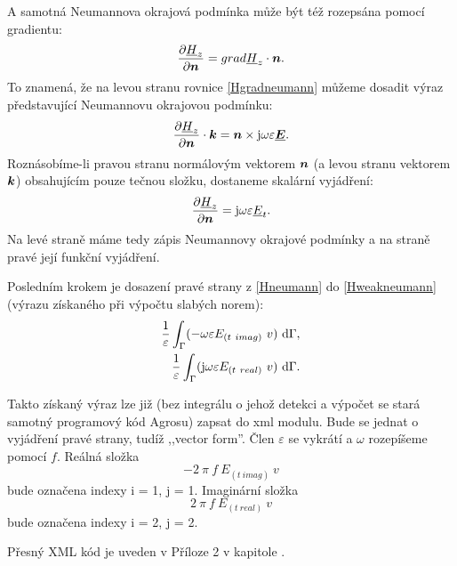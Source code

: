 \documentclass[12pt,a4paper,oneside]{article}
\numberwithin{equation}{section} %
\numberwithin{figure}{section} %
\numberwithin{table}{section} %
\newcommand{\mj}{\mathrm{j}} %
\renewcommand{\vec}[1]{\mbox{\boldmath$#1$}} %
\newcommand{\faz}[1]{{\underline{#1}}} %
\begin{document}
A samotná Neumannova okrajová podmínka může být též rozepsána pomocí gradientu:
\begin{equation}
\label{Hgradneumann}
\frac{\partial \faz{H}_z}{\partial \vec{n}} = grad \faz{H}_z \cdot \vec{n} .
\end{equation}
To znamená, že na levou stranu rovnice \ref{Hgradneumann} můžeme dosadit výraz představující Neumannovu okrajovou podmínku:
\begin{equation}
\label{NeumannHKvek}
\frac{\partial \faz{H}_z}{\partial \vec{n}} \cdot \vec{k} = \vec{n} \times \mj \omega \varepsilon \faz{\vec{E}}.
\end{equation}
Roznásobíme-li pravou stranu normálovým vektorem $\vec{n}$ (a levou stranu vektorem $\vec{k}$) obsahujícím pouze tečnou složku, dostaneme skalární vyjádření:
\begin{equation}
\label{Hneumann}
\frac{\partial \faz{H}_z}{\partial \vec{n}} = \mj \omega \varepsilon \faz{E}_t .
\end{equation}
Na levé straně máme tedy zápis Neumannovy okrajové podmínky a na straně pravé její funkční vyjádření.

Posledním krokem je dosazení pravé strany z \ref{Hneumann} do \ref{Hweakneumann} (výrazu získaného při výpočtu slabých norem):
\begin{subequations}
\begin{align}
\frac{1}{\varepsilon} \int _{\Gamma} (- \omega \varepsilon E_{(t~imag)} ~ v ) ~ \ud \Gamma ,
\\ 
\frac{1}{\varepsilon} \int _{\Gamma} (\mj \omega \varepsilon E_{(t~real)} ~ v ) ~ \ud \Gamma .
\end{align}
\end{subequations}

Takto získaný výraz lze již (bez integrálu o jehož detekci a výpočet se stará samotný programový kód Agrosu) zapsat do xml modulu. Bude se jednat o vyjádření pravé strany, tudíž ,,vector form''. Člen $\varepsilon$ se vykrátí a $\omega$ rozepíšeme pomocí $f$. Reálná složka  
\begin{equation}
- 2 ~ \pi ~ f ~ E_{(t~imag)} ~ v
\end{equation} 
bude označena indexy i = 1, j = 1. Imaginární složka 
\begin{equation}
2 ~ \pi ~ f ~ E_{(t~real)} ~ v
\end{equation}
bude označena indexy i = 2, j = 2.

Přesný XML kód je uveden v Příloze 2 v kapitole .
\end{document}
